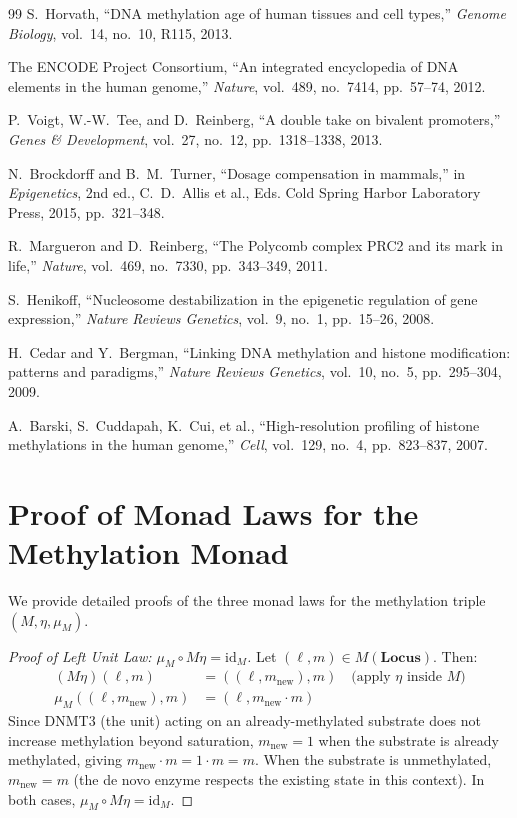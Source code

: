 \documentclass[12pt,a4paper]{article}
\newcommand{\cat}[1]{\mathbf{#1}}
\newcommand{\id}{\mathrm{id}}
\begin{document}
\begin{thebibliography}{99}
S.~Horvath,
``DNA methylation age of human tissues and cell types,''
\textit{Genome Biology}, vol.~14, no.~10, R115, 2013.

The ENCODE Project Consortium,
``An integrated encyclopedia of DNA elements in the human genome,''
\textit{Nature}, vol.~489, no.~7414, pp.~57--74, 2012.

P.~Voigt, W.-W.~Tee, and D.~Reinberg,
``A double take on bivalent promoters,''
\textit{Genes \& Development}, vol.~27, no.~12, pp.~1318--1338, 2013.

N.~Brockdorff and B.~M.~Turner,
``Dosage compensation in mammals,''
in \textit{Epigenetics}, 2nd ed., C.~D.~Allis et al., Eds.
Cold Spring Harbor Laboratory Press, 2015, pp.~321--348.

R.~Margueron and D.~Reinberg,
``The Polycomb complex PRC2 and its mark in life,''
\textit{Nature}, vol.~469, no.~7330, pp.~343--349, 2011.

S.~Henikoff,
``Nucleosome destabilization in the epigenetic regulation of gene expression,''
\textit{Nature Reviews Genetics}, vol.~9, no.~1, pp.~15--26, 2008.

H.~Cedar and Y.~Bergman,
``Linking DNA methylation and histone modification: patterns and paradigms,''
\textit{Nature Reviews Genetics}, vol.~10, no.~5, pp.~295--304, 2009.

A.~Barski, S.~Cuddapah, K.~Cui, et al.,
``High-resolution profiling of histone methylations in the human genome,''
\textit{Cell}, vol.~129, no.~4, pp.~823--837, 2007.

\end{thebibliography}

\appendix

\section{Proof of Monad Laws for the Methylation Monad}
\label{app:monad-proofs}

We provide detailed proofs of the three monad laws for the methylation triple $(M, \eta, \mu_M)$.

\begin{proof}[Proof of Left Unit Law: $\mu_M \circ M\eta = \id_M$]
Let $(\ell, m) \in M(\cat{Locus})$. Then:
\begin{align}
    (M\eta)(\ell, m) &= ((\ell, m_{\mathrm{new}}), m) \quad \text{(apply $\eta$ inside $M$)} \\
    \mu_M((\ell, m_{\mathrm{new}}), m) &= (\ell, m_{\mathrm{new}} \cdot m)
\end{align}
Since DNMT3 (the unit) acting on an already-methylated substrate does not increase methylation beyond saturation, $m_{\mathrm{new}} = 1$ when the substrate is already methylated, giving $m_{\mathrm{new}} \cdot m = 1 \cdot m = m$. When the substrate is unmethylated, $m_{\mathrm{new}} = m$ (the de novo enzyme respects the existing state in this context). In both cases, $\mu_M \circ M\eta = \id_M$.
\end{proof}
\end{document}
